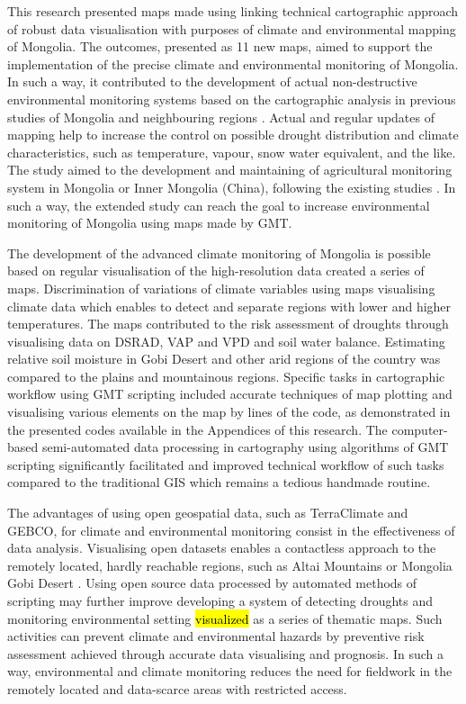 \documentclass[geosciences,article,submit,pdftex,moreauthors]{Definitions/mdpi}
\begin{document}
This research presented maps made using linking technical cartographic approach of robust data visualisation with purposes of climate and environmental mapping of Mongolia. The outcomes, presented as 11 new maps, aimed to support the implementation of the precise climate and environmental monitoring of Mongolia. In such a way, it contributed to the development of actual non-destructive environmental monitoring systems based on the cartographic analysis in previous studies of Mongolia and neighbouring regions \cite{MENG2021107908,DASHPUREV2021108331,SAINNEMEKH2022104654,Batunacun}. Actual and regular updates of mapping help to increase the control on possible drought distribution and climate characteristics, such as temperature, vapour, snow water equivalent, and the like. The study aimed to the development and maintaining of agricultural monitoring system in Mongolia or Inner Mongolia (China), following the existing studies \cite{Rina,Long,Zheng}. In such a way, the extended study can reach the goal to increase environmental monitoring of Mongolia using maps made by GMT.

The development of the advanced climate monitoring of Mongolia is possible based on regular visualisation of the high-resolution data created a series of maps. Discrimination of variations of climate variables using maps visualising climate data which enables to detect and separate regions with lower and higher temperatures. The maps contributed to the risk assessment of droughts through visualising data on DSRAD, VAP and VPD and soil water balance. Estimating relative soil moisture in Gobi Desert and other arid regions of the country was compared to the plains and mountainous regions. Specific tasks in cartographic workflow using GMT scripting included accurate techniques of map plotting and visualising various elements on the map by lines of the code, as demonstrated in the presented codes available in the Appendices of this research. The computer-based semi-automated data processing in cartography using algorithms of GMT scripting significantly facilitated and improved technical workflow of such tasks compared to the traditional GIS which remains a tedious handmade routine. 

The advantages of using open geospatial data, such as TerraClimate and GEBCO, for climate and environmental monitoring consist in the effectiveness of data analysis. Visualising open datasets enables a contactless approach to the remotely located, hardly reachable regions, such as Altai Mountains or Mongolia Gobi Desert \cite{HEINER202078}. Using open source data processed by automated methods of scripting may further improve developing a system of detecting droughts and monitoring environmental setting \hl{visualized} as a series of thematic maps. Such activities can prevent climate and environmental hazards by preventive risk assessment achieved through accurate data visualising and prognosis. In such a way, environmental and climate monitoring reduces the need for fieldwork in the remotely located and data-scarce areas with restricted access.
\end{document}
